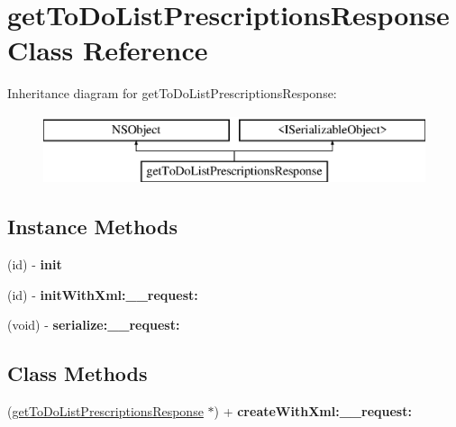 \hypertarget{interfaceget_to_do_list_prescriptions_response}{}\section{get\+To\+Do\+List\+Prescriptions\+Response Class Reference}
\label{interfaceget_to_do_list_prescriptions_response}
Inheritance diagram for get\+To\+Do\+List\+Prescriptions\+Response\+:\begin{figure}[H]
\begin{center}
\leavevmode
\includegraphics[height=2.000000cm]{interfaceget_to_do_list_prescriptions_response}
\end{center}
\end{figure}
\subsection*{Instance Methods}
\begin{DoxyCompactItemize}
\item 
\hypertarget{interfaceget_to_do_list_prescriptions_response_a4580b8b65029cc33c05b63ce0a5a79fa}{}(id) -\/ {\bfseries init}\label{interfaceget_to_do_list_prescriptions_response_a4580b8b65029cc33c05b63ce0a5a79fa}

\item 
\hypertarget{interfaceget_to_do_list_prescriptions_response_a1831c8c0528c88c5ce553050582f2109}{}(id) -\/ {\bfseries init\+With\+Xml\+:\+\_\+\+\_\+request\+:}\label{interfaceget_to_do_list_prescriptions_response_a1831c8c0528c88c5ce553050582f2109}

\item 
\hypertarget{interfaceget_to_do_list_prescriptions_response_a53cf78abf5a561df19bf937a739f672d}{}(void) -\/ {\bfseries serialize\+:\+\_\+\+\_\+request\+:}\label{interfaceget_to_do_list_prescriptions_response_a53cf78abf5a561df19bf937a739f672d}

\end{DoxyCompactItemize}
\subsection*{Class Methods}
\begin{DoxyCompactItemize}
\item 
\hypertarget{interfaceget_to_do_list_prescriptions_response_a0b559375077ccfc802984f77707a33f1}{}(\hyperlink{interfaceget_to_do_list_prescriptions_response}{get\+To\+Do\+List\+Prescriptions\+Response} $\ast$) + {\bfseries create\+With\+Xml\+:\+\_\+\+\_\+request\+:}\label{interfaceget_to_do_list_prescriptions_response_a0b559375077ccfc802984f77707a33f1}

\end{DoxyCompactItemize}
